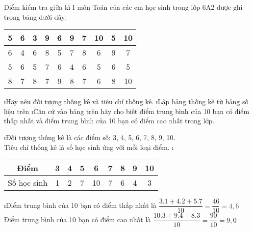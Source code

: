 \begin{bt}
	Điểm kiểm tra giữa kì I môn Toán của các em học sinh trong lớp 6A2 được ghi trong bảng dưới đây:
	\begin{center}
		\begin{tabular}{|c|c|c|c|c|c|c|c|c|c|}
			\hline
			5&	6&	3&	9&	6&	9&	7&	10&	5&	10\\
			\hline
			6&	4&	6&	8&	5&	7&	8&	6&	9&	7\\
			\hline
			5&	6&	5&	7&	6&	4&	6&	5&	6&	5\\
			\hline
			8&	7&	8&	7&	9&	8&	7&	6&	8&	10\\
			\hline
		\end{tabular}
	\end{center}
	\begin{enumerate}[a),leftmargin=*]
		\i Hãy nêu đối tượng thống kê và tiêu chí thống kê.
		\i Lập bảng thống kê từ bảng số liệu trên
		\i Căn cứ vào bảng trên hãy cho biết điểm trung bình của 10 bạn có điểm thấp nhất và điểm trung bình của 10 bạn có điểm cao nhất trong lớp.
	\end{enumerate}
	\begin{loigiaichuong39}
		\begin{enumerate}[a),leftmargin=*]
			\i Đối tượng thống kê là các điểm số: 3, 4, 5, 6, 7, 8, 9, 10.\\
			 Tiêu chí thống kê là số học sinh ứng với mỗi loại điểm.
			\i \begin{tabular}{|c|c|c|c|c|c|c|c|c|}
				\hline
					Điểm&	3&	4	&5&	6&	7&	8&	9&	10\\
					\hline
				Số học sinh&	1&	2&	7&	10&	7&	6	&4&	3\\
				\hline
			\end{tabular} 
		
			\i Điểm trung bình của 10 bạn có điểm thấp nhất là  $\dfrac{{3.1 + 4.2 + 5.7}}{{10}} = \dfrac{{46}}{{10}} = 4,6$\\
			Điểm trung bình của 10 bạn có điểm cao nhất là  $\dfrac{{10.3 + 9.4 + 8.3}}{{10}} = \dfrac{{90}}{{10}} = 9,0$
		\end{enumerate}
	\end{loigiaichuong39}
\end{bt}








